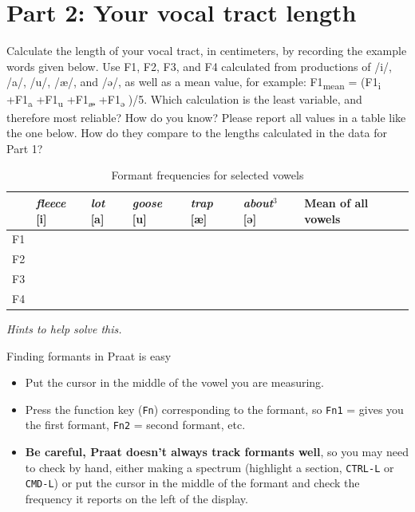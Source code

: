 \documentclass[12pt, letterpaper]{article}
\begin{document}
\section*{Part 2: Your vocal tract length} \label{sec:spectra}

Calculate the length of your vocal tract, in centimeters, by recording the example words given below. Use F1, F2, F3, and F4 calculated from productions of /i/, /a/, /u/, /æ/, and /ə/, as well as a mean value, for example: F1\textsubscript{mean} = (F1\textsubscript{i} +F1\textsubscript{a} +F1\textsubscript{u} +F1\textsubscript{æ} +F1\textsubscript{ə} )/5. Which calculation is the least variable, and therefore most reliable? How do you know? Please report all values in a table like the one below. How do they compare to the lengths calculated in the data for Part 1?

\begin{table}[h!]
\renewcommand{\arraystretch}{1.3}
\caption{Formant frequencies for selected vowels}
\centering
\begin{tabularx}{\textwidth}{|c|X|X|X|X|X|X|}
\hline
 & \textit{fleece} [i] & \textit{lot} [a] & \textit{goose} [u] & \textit{trap} [æ] & \textit{about}$^{3}$ [ə] & Mean of all vowels \\
\hline
F1 &  &  &  &  &  &  \\
\hline
F2 &  &  &  &  &  &  \\
\hline
F3 &  &  &  &  &  &  \\
\hline
F4 &  &  &  &  &  &  \\
\hline
\end{tabularx}
\end{table}

\textit{Hints to help solve this.}

Finding formants in Praat is easy
\begin{itemize}
    \item Put the cursor in the middle of the vowel you are measuring.
    \item Press the function key (\texttt{Fn}) corresponding to the formant, so \texttt{Fn1} = gives you the first formant, \texttt{Fn2} = second formant, etc.
    \item \textbf{Be careful, Praat doesn’t always track formants well}, so you may need to check by hand, either making a spectrum (highlight a section, \texttt{CTRL-L} or \texttt{CMD-L}) or put the cursor in the middle of the formant and check the frequency it reports on the left of the display.
\end{itemize}
\end{document}
